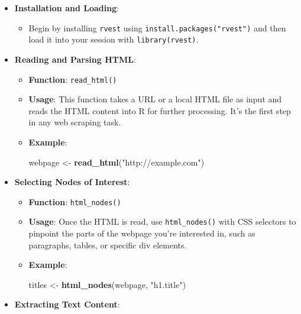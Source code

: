 \documentclass[
]{book}
\newenvironment{Shaded}{\begin{snugshade}}{\end{snugshade}}
\newcommand{\FunctionTok}[1]{\textcolor[rgb]{0.13,0.29,0.53}{\textbf{#1}}}
\newcommand{\NormalTok}[1]{#1}
\newcommand{\OtherTok}[1]{\textcolor[rgb]{0.56,0.35,0.01}{#1}}
\newcommand{\StringTok}[1]{\textcolor[rgb]{0.31,0.60,0.02}{#1}}
\providecommand{\tightlist}{%
  \setlength{\itemsep}{0pt}\setlength{\parskip}{0pt}}
\begin{document}
\begin{itemize}
\tightlist
\item
  \textbf{Installation and Loading}:

  \begin{itemize}
  \tightlist
  \item
    Begin by installing \texttt{rvest} using \texttt{install.packages("rvest")} and then load it into your session with \texttt{library(rvest)}.
  \end{itemize}
\item
  \textbf{Reading and Parsing HTML}:

  \begin{itemize}
  \item
    \textbf{Function}: \texttt{read\_html()}
  \item
    \textbf{Usage}: This function takes a URL or a local HTML file as input and reads the HTML content into R for further processing. It's the first step in any web scraping task.
  \item
    \textbf{Example}:

\begin{Shaded}
\begin{Highlighting}[]
\NormalTok{webpage }\OtherTok{\textless{}{-}} \FunctionTok{read\_html}\NormalTok{(}\StringTok{"http://example.com"}\NormalTok{)}
\end{Highlighting}
\end{Shaded}
  \end{itemize}
\item
  \textbf{Selecting Nodes of Interest}:

  \begin{itemize}
  \item
    \textbf{Function}: \texttt{html\_nodes()}
  \item
    \textbf{Usage}: Once the HTML is read, use \texttt{html\_nodes()} with CSS selectors to pinpoint the parts of the webpage you're interested in, such as paragraphs, tables, or specific div elements.
  \item
    \textbf{Example}:

\begin{Shaded}
\begin{Highlighting}[]
\NormalTok{titles }\OtherTok{\textless{}{-}} \FunctionTok{html\_nodes}\NormalTok{(webpage, }\StringTok{"h1.title"}\NormalTok{)}
\end{Highlighting}
\end{Shaded}
  \end{itemize}
\item
  \textbf{Extracting Text Content}:


\end{itemize}
\end{document}
